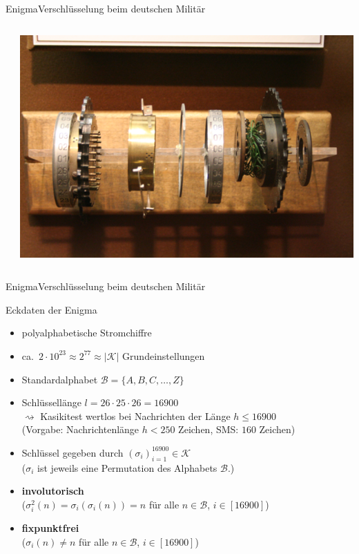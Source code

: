 \documentclass{beamer}
\newcommand{\mc}{\mathcal}
\theoremstyle{plain}
\begin{document}
\begin{frame}{Enigma}{Verschlüsselung beim deutschen Militär}
\begin{columns}
\begin{column}{0.3\textwidth}
    \end{column}
    \begin{column}{0.3\textwidth}
  \includegraphics[width=\textwidth]{enigma_walzen}   
    \end{column}
   \end{columns}
 \end{frame}
 
 
 \begin{frame}{Enigma}{Verschlüsselung beim deutschen Militär} 
 
 \begin{block}{Eckdaten der Enigma}
 \begin{itemize}[<+->]
  \item polyalphabetische Stromchiffre
  \item ca.~$2 \cdot 10^{23} \approx 2^{77}  \approx |\mc K|$ Grundeinstellungen\\
  \item Standardalphabet $\mc B = \{A, B, C, \dots, Z\}$
  \item Schlüssellänge $l = 26 \cdot 25 \cdot  26 = 16900$\\
  $\rightsquigarrow$ Kasikitest wertlos bei Nachrichten der Länge $h \leq 16900$ \\
  \hspace{0.3cm} (Vorgabe: Nachrichtenlänge $h < 250$ Zeichen, SMS: $160$ Zeichen)
  \item Schlüssel gegeben durch $(\sigma_i)_{i=1}^{16900} \in \mc K$ \\
  ($\sigma_i$ ist jeweils eine Permutation des Alphabets $\mc B$.)
  \item \textbf{involutorisch} \\
  ($\sigma_i^2(n) = \sigma_i(\sigma_i(n)) = n$ für alle $n \in \mc B$, $i \in [16900]$)
  \item \textbf{fixpunktfrei}\\
  ($\sigma_i(n) \neq n$ für alle $n \in \mc B$, $i \in [16900]$)
 \end{itemize}
 \end{block}
  \end{frame}
  
\end{document}

